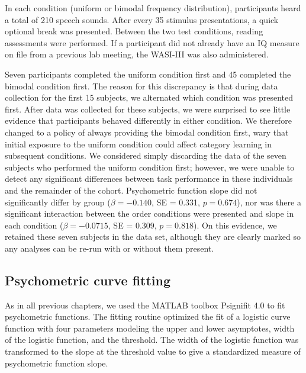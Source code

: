 \documentclass[../uwthesis.tex]{subfiles}
\begin{document}
In each condition (uniform or bimodal frequency distribution), participants heard a total of 210 speech sounds. After every 35 stimulus presentations, a quick optional break was presented. Between the two test conditions, reading assessments were performed. If a participant did not already have an IQ measure on file from a previous lab meeting, the WASI-III was also administered.

Seven participants completed the uniform condition first and 45 completed the bimodal condition first. The reason for this discrepancy is that during data collection for the first 15 subjects, we alternated which condition was presented first. After data was collected for these subjects, we were surprised to see little evidence that participants behaved differently in either condition. We therefore changed to a policy of always providing the bimodal condition first, wary that initial exposure to the uniform condition could affect category learning in subsequent conditions. We considered simply discarding the data of the seven subjects who performed the uniform condition first; however, we were unable to detect any significant differences between task performance in these individuals and the remainder of the cohort. Psychometric function slope did not significantly differ by group ($\beta = -0.140$, SE = 0.331, $p=0.674$), nor was there a significant interaction between the order conditions were presented and slope in each condition ($\beta = -0.0715$, SE = 0.309, $p=0.818$). On this evidence, we retained these seven subjects in the data set, although they are clearly marked so any analyses can be re-run with or without them present. 

\subsection{Psychometric curve fitting}
As in all previous chapters, we used the MATLAB toolbox Psignifit 4.0 to fit psychometric functions. The fitting routine optimized the fit of a logistic curve function with four parameters modeling the upper and lower asymptotes, width of the logistic function, and the threshold. The width of the logistic function was transformed to the slope at the threshold value to give a standardized measure of psychometric function slope. 
\end{document}
